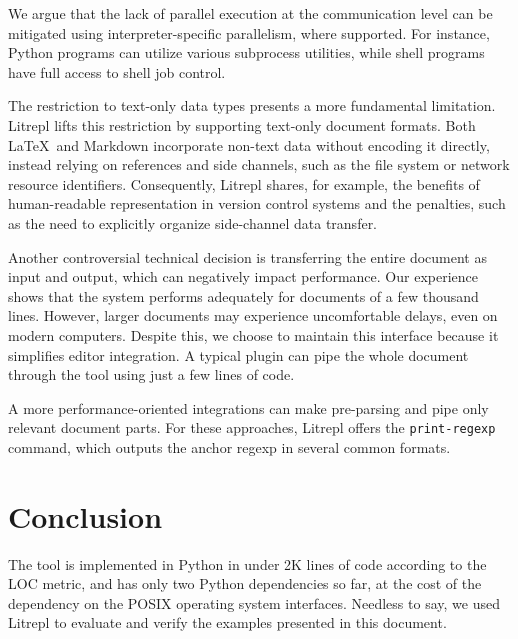 \documentclass[letterpaper,12pt,twocolumn]{article}
\newcommand{\Latex}{\LaTeX\ }
\begin{document}
We argue that the lack of parallel execution at the communication level can be
mitigated using interpreter-specific parallelism, where supported. For instance,
Python programs can utilize various subprocess utilities, while shell programs
have full access to shell job control.

The restriction to text-only data types presents a more fundamental limitation.
Litrepl lifts this restriction by supporting text-only document formats. Both
\Latex and Markdown incorporate non-text data without encoding it directly,
instead relying on references and side channels, such as the file system or
network resource identifiers. Consequently, Litrepl shares, for example, the
benefits of human-readable representation in version control systems and the
penalties, such as the need to explicitly organize side-channel data transfer.

Another controversial technical decision is transferring the entire document as
input and output, which can negatively impact performance. Our experience shows
that the system performs adequately for documents of a few thousand lines.
However, larger documents may experience uncomfortable delays, even on modern
computers. Despite this, we choose to maintain this interface because it
simplifies editor integration. A typical plugin can pipe the whole document
through the tool using just a few lines of code.

A more performance-oriented integrations can make pre-parsing and pipe only
relevant document parts. For these approaches, Litrepl offers the
\verb|print-regexp| command, which outputs the anchor regexp in several common
formats.

\section{Conclusion}

The tool is implemented in Python in under 2K lines of code according to the LOC
metric, and has only two Python dependencies so far, at the cost of the
dependency on the POSIX operating system interfaces. Needless to say, we used
Litrepl to evaluate and verify the examples presented in this document.

\printbibliography
\end{document}
